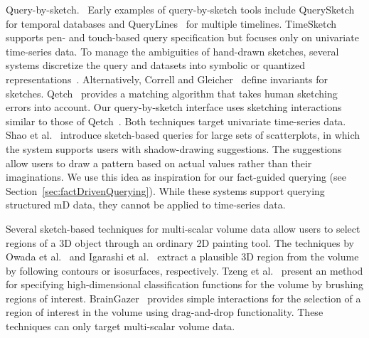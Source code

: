 \textsf{Query-by-sketch.\ } 
Early examples of query-by-sketch tools include QuerySketch~\cite{Wattenberg2001} for temporal databases and QueryLines~\cite{Ryall2005} for multiple timelines. 
TimeSketch~\cite{Eichmann2015} supports pen- and touch-based query specification but focuses only on univariate time-series data.
To manage the ambiguities of hand-drawn sketches, several systems discretize the query and datasets into symbolic or quantized representations~\cite{Muthumanickam2016,ruta2019sax}.
%
Alternatively, Correll and Gleicher~\cite{Correll2016} define invariants for sketches. %
Qetch~\cite{Mannino2018} provides a matching algorithm that takes human sketching errors into account.
Our query-by-sketch interface uses sketching interactions similar to those of Qetch~\cite{Mannino2018}.
Both techniques target univariate time-series data.
%
Shao et al.~\cite{Shao2014} introduce sketch-based queries for large sets of scatterplots,
in which the system supports users with shadow-drawing suggestions. %
The suggestions allow users to draw a pattern based on actual values rather than their imaginations.
We use this idea as inspiration for our fact-guided querying (see Section~\ref{sec:factDrivenQuerying}).
While these systems support querying structured mD data, they cannot be applied to time-series data.

Several sketch-based techniques for multi-scalar volume data allow users to select regions of a 3D object through an ordinary 2D painting tool.
The techniques by Owada et al.~\cite{Owada2005} and Igarashi et al.~\cite{Igarashi2016} extract a plausible 3D region from the volume
by following contours or isosurfaces, respectively.
Tzeng et al.~\cite{Tzeng2003} present an method for specifying high-dimensional classification functions for the volume
by brushing regions of interest. %
BrainGazer~\cite{Bruckner2009} provides simple interactions for the selection of a region of interest in the volume
using drag-and-drop functionality.
These techniques can only target multi-scalar volume data. 

